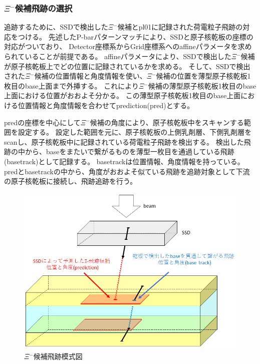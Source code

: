 \documentclass[12pt,a4paper]{jarticle}
\begin{document}
\subsubsection{$\Xi$$^-$候補飛跡の選択}
追跡するために、SSDで検出した$\Xi$$^-$候補とpl01に記録された荷電粒子飛跡の対応をつける。
先述したP-barパターンマッチにより、SSDと原子核乾板の座標の対応がついており、
Detector座標系からGrid座標系へのaffineパラメータを求められていることが前提である。
affineパラメータにより、SSDで検出した$\Xi$$^-$候補が原子核乾板上でどの位置に記録されているかを求める。
そして、SSDで検出された$\Xi$$^-$候補の位置情報と角度情報を使い、$\Xi$$^-$候補の位置を薄型原子核乾板1枚目のbase上面まで外挿する。
これにより$\Xi$$^-$候補の薄型原子核乾板1枚目のbase上面における位置がおおよそ分かる。
この薄型原子核乾板1枚目のbase上面における位置情報と角度情報を合わせてprediction(pred)とする。
\par
predの座標を中心にして$\Xi$$^-$候補の角度により、原子核乾板中をスキャンする範囲を設定する。
設定した範囲を元に、原子核乾板の上側乳剤層、下側乳剤層をscanし、原子核乾板中に記録されている荷電粒子飛跡を検出する。
検出した飛跡の中から、baseをまたいで繋がるものを薄型一枚目を通過している飛跡(basetrack)として記録する。
basetrackは位置情報、角度情報を持っている。
predとbasetrackの中から、角度がおおよそ似ている飛跡を追跡対象として下流の原子核乾板に接続し、飛跡追跡を行う。
\begin{figure}[htbp]
  \centering
     \includegraphics[width=140mm]{pl01_mosikizu.png}
  \caption{$\Xi$$^-$候補飛跡模式図\label{fig:pl01_mosikizu}}
\end{figure}
\end{document}
